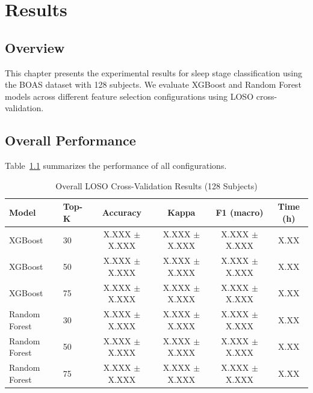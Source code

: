 \chapter{Results}
\label{ch:results}


\section{Overview}
\label{sec:results_overview}

This chapter presents the experimental results for sleep stage classification using the BOAS dataset with 128 subjects. We evaluate XGBoost and Random Forest models across different feature selection configurations using LOSO cross-validation.


\section{Overall Performance}
\label{sec:overall_performance}

Table~\ref{tab:overall_results} summarizes the performance of all configurations.

\begin{table}[htbp]
    \centering
    \caption{Overall LOSO Cross-Validation Results (128 Subjects)}
    \label{tab:overall_results}
    \begin{tabular}{llcccc}
        \toprule
        \textbf{Model} & \textbf{Top-K} & \textbf{Accuracy} & \textbf{Kappa} & \textbf{F1 (macro)} & \textbf{Time (h)} \\
        \midrule
        XGBoost & 30 & X.XXX $\pm$ X.XXX & X.XXX $\pm$ X.XXX & X.XXX $\pm$ X.XXX & X.XX \\
        XGBoost & 50 & X.XXX $\pm$ X.XXX & X.XXX $\pm$ X.XXX & X.XXX $\pm$ X.XXX & X.XX \\
        XGBoost & 75 & X.XXX $\pm$ X.XXX & X.XXX $\pm$ X.XXX & X.XXX $\pm$ X.XXX & X.XX \\
        \midrule
        Random Forest & 30 & X.XXX $\pm$ X.XXX & X.XXX $\pm$ X.XXX & X.XXX $\pm$ X.XXX & X.XX \\
        Random Forest & 50 & X.XXX $\pm$ X.XXX & X.XXX $\pm$ X.XXX & X.XXX $\pm$ X.XXX & X.XX \\
        Random Forest & 75 & X.XXX $\pm$ X.XXX & X.XXX $\pm$ X.XXX & X.XXX $\pm$ X.XXX & X.XX \\
        \bottomrule
    \end{tabular}
\end{table}

